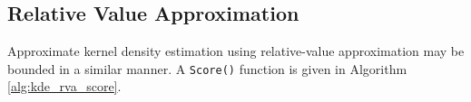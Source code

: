 %
%
%


\subsection{Relative Value Approximation}

Approximate kernel density estimation using relative-value approximation may be
bounded in a similar manner.  A \texttt{Score()} function is given in Algorithm
\ref{alg:kde_rva_score}.
